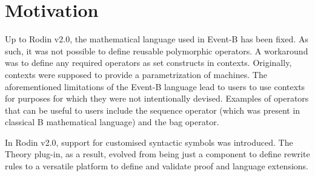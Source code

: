 \documentclass{article}      %
\begin{document}
\section{Motivation}
Up to Rodin v2.0, the mathematical language used in Event-B has been fixed. As such, it was not possible to define reusable polymorphic operators. A workaround was to define any required operators as set constructs in contexts. Originally, contexts were supposed to provide a parametrization of machines. The aforementioned limitations of the Event-B language lead to users to use contexts for purposes for which they were not intentionally devised. Examples of operators that can be useful to users include the sequence operator (which was present in classical B mathematical language) and the bag operator.
\par
In Rodin v2.0, support for customised syntactic symbols was introduced. The Theory plug-in, as a result, evolved from being just a component to define rewrite rules to a versatile platform to define and validate proof and language extensions.
\end{document}
